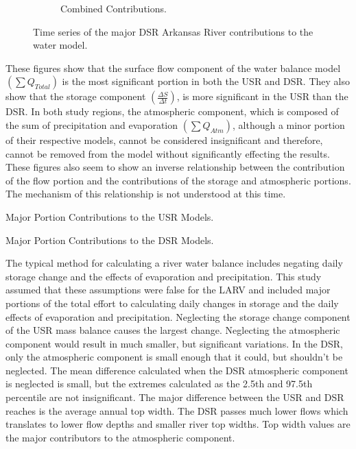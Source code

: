 \begin{linenumbers}
\begin{figure}[htbp]
\begin{subfigure}{0.5\textwidth}
		\caption{Combined Contributions.}
	\end{subfigure}
	\caption[Time series of the major DSR Arkansas River contributions to the water model.]{Time series of the major DSR Arkansas River contributions to the water model.}
	\label{fig:DSRWaterContrib}
\end{figure}

These figures show that the surface flow component of the water balance model $ \displaystyle \left( \sum Q_{Total} \right) $ is the most significant portion in both the USR and DSR.  They also show that the storage component $ \displaystyle \left( \frac{\Delta S}{\Delta t} \right) $, is more significant in the USR than the DSR.  In both study regions, the atmospheric component, which is composed of the sum of precipitation and evaporation $ \displaystyle \left( \sum Q_{Atm} \right) $, although a minor portion of their respective models, cannot be considered insignificant and therefore, cannot be removed from the model without significantly effecting the results.  These figures also seem to show an inverse relationship between the contribution of the flow portion and the contributions of the storage and atmospheric portions.  The mechanism of this relationship is not understood at this time.

\begin{table}[htbp]
	\centering
	\caption[Major Portion Contributions to the USR Models.]{Major Portion Contributions to the USR Models.}
	\label{tab:USRContrib}
	
\end{table}
\tablevspace
\begin{table}[htbp]
	\centering
	\caption[Major Portion Contributions to the DSR Models.]{Major Portion Contributions to the DSR Models.}
	\label{tab:DSRContrib}
	
\end{table}

The typical method for calculating a river water balance includes negating daily storage change and the effects of evaporation and precipitation.  This study assumed that these assumptions were false for the LARV and included major portions of the total effort to calculating daily changes in storage and the daily effects of evaporation and precipitation.  Neglecting the storage change component of the USR mass balance causes the largest change.  Neglecting the atmospheric component would result in much smaller, but significant variations.  In the DSR, only the atmospheric component is small enough that it could, but shouldn't be neglected.  The mean difference calculated when the DSR atmospheric component is neglected is small, but the extremes calculated as the 2.5th and 97.5th percentile are not insignificant.  The major difference between the USR and DSR reaches is the average annual top width.  The DSR passes much lower flows which translates to lower flow depths and smaller river top widths.  Top width values are the major contributors to the atmospheric component.


\end{linenumbers}
